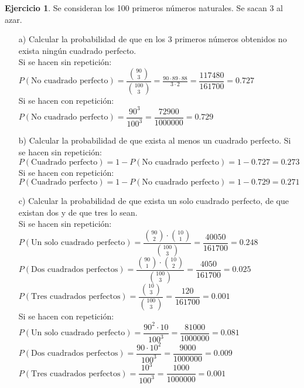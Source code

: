 \documentclass[a4paper, 12pt]{article}
\theoremstyle{definition}
\newtheorem{ej}{Ejercicio}
\begin{document}
\begin{ej}
Se consideran los 100 primeros números naturales. Se sacan 3 al azar.\\
\begin{enumerate}
    \item[a) ] Calcular la probabilidad de que en los 3 primeros números obtenidos no exista ningún cuadrado perfecto. \\
    Si se hacen sin repetición: \\ $P(\text{No cuadrado perfecto}) = \dfrac{{90 \choose 3}}{{100 \choose 3}}  = \frac{90\cdot89\cdot88}{3\cdot2}= \dfrac{117480}{161700} = 0.727$  \\
    Si se hacen con repetición: \\  $P(\text{No cuadrado perfecto}) = \dfrac{90^3}{100^3}=\dfrac{72900}{1000000} = 0.729$
    \item[b) ] Calcular la probabilidad de que exista al menos un cuadrado perfecto.
    Si se hacen sin repetición: \\ $P(\text{Cuadrado perfecto}) = 1 - P(\text{No cuadrado perfecto}) = 1 - 0.727 = 0.273$ \\
    Si se hacen con repetición: \\ $P(\text{Cuadrado perfecto}) = 1 - P(\text{No cuadrado perfecto}) = 1 - 0.729 = 0.271$
    \item[c) ] Calcular la probabilidad de que exista un solo cuadrado perfecto, de que existan dos y de que tres lo sean.\\
    Si se hacen sin repetición: \\ 
    $P(\text{Un solo cuadrado perfecto}) = \dfrac{{90 \choose 2} \cdot {10 \choose 1}}{{100 \choose 3}} = \dfrac{40050}{161700} = 0.248$ \\
    $P(\text{Dos cuadrados perfectos}) = \dfrac{{90 \choose 1} \cdot {10 \choose 2}}{{100 \choose 3}} = \dfrac{4050}{161700} = 0.025$\\
    $P(\text{Tres cuadrados perfectos}) = \dfrac{{10 \choose 3}}{{100 \choose 3}} = \dfrac{120}{161700} = 0.001$\\
    Si se hacen con repetición:\\
    $P(\text{Un solo cuadrado perfecto}) = \dfrac{90^2\cdot 10}{100^3} = \dfrac{81000}{1000000} = 0.081$ \\
    $P(\text{Dos cuadrados perfectos}) = \dfrac{90 \cdot 10^2}{100^3} = \dfrac{9000}{1000000} = 0.009$\\
    $P(\text{Tres cuadrados perfectos}) = \dfrac{10^3}{100^3} = \dfrac{1000}{1000000} = 0.001$\\
    
\end{enumerate}
\end{ej}
\end{document}
